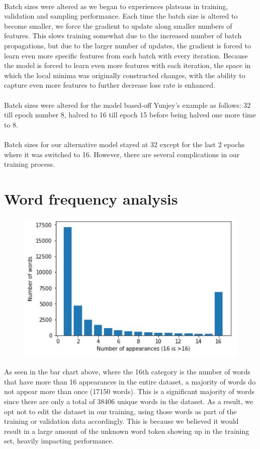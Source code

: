 \documentclass{proc}
\begin{document}
\paragraph{} Batch sizes were altered as we began to experiences plateaus in training, validation and sampling performance. Each time the batch size is altered to become smaller, we force the gradient to update along smaller numbers of features. This slows training somewhat due to the increased number of batch propagations, but due to the larger number of updates, the gradient is forced to learn even more specific features from each batch with every iteration. Because the model is forced to learn even more features with each iteration, the space in which the local minima was originally constructed changes, with the ability to capture even more features to further decrease loss rate is enhanced.
\paragraph{} Batch sizes were altered for the model based-off Yunjey's example as follows: 32 till epoch number 8, halved to 16 till epoch 15 before being halved one more time to 8.
\paragraph{} Batch sizes for our alternative model stayed at 32 except for the last 2 epochs where it was switched to 16. However, there are several complications in our training process.
\section{Word frequency analysis}
\begin{figure}[h!]
  \includegraphics[width=\linewidth]{barchar.JPG}
\end{figure}
As seen in the bar chart above, where the 16th category is the number of words that have more than 16 appearances in the entire dataset, a majority of words do not appear more than once (17150 words). This is a significant majority of words since there are only a total of 38406 unique words in the dataset. As a result, we opt not to edit the dataset in our training, using those words as part of the training or validation data accordingly. This is because we believed it would result in a large amount of the unknown word token showing up in the training set, heavily impacting performance. 
\end{document}

